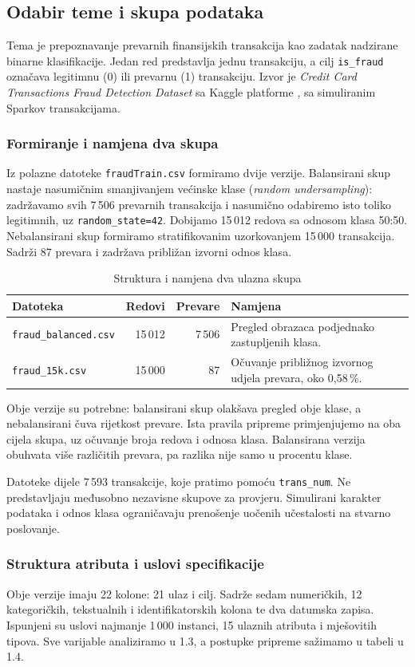 \subsection{Odabir teme i skupa podataka}\label{sec:podaci}
Tema je prepoznavanje prevarnih finansijskih transakcija kao zadatak nadzirane
binarne klasifikacije. Jedan red predstavlja jednu transakciju, a cilj
\texttt{is\_fraud} označava legitimnu (0) ili prevarnu (1) transakciju.
Izvor je \emph{Credit Card Transactions Fraud Detection Dataset} sa Kaggle platforme
\cite{kaggle_fraud}, sa simuliranim Sparkov transakcijama.

\subsubsection*{Formiranje i namjena dva skupa}
Iz polazne datoteke \texttt{fraudTrain.csv} formiramo dvije verzije.
Balansirani skup nastaje nasumičnim smanjivanjem većinske klase
(\emph{random undersampling}): zadržavamo svih 7\,506 prevarnih transakcija i
nasumično odabiremo isto toliko legitimnih, uz \texttt{random\_state=42}.
Dobijamo 15\,012 redova sa odnosom klasa 50:50.
Nebalansirani skup formiramo stratifikovanim uzorkovanjem 15\,000 transakcija.
Sadrži 87 prevara i zadržava približan izvorni odnos klasa.

\begin{table}[H]\centering\small
\caption{Struktura i namjena dva ulazna skupa}\label{tab:osnovni}
\begin{tabularx}{\linewidth}{@{}YrrY@{}}\toprule
Datoteka & Redovi & Prevare & Namjena \\ \midrule
\texttt{fraud\_balanced.csv} & 15\,012 & 7\,506 & Pregled obrazaca podjednako zastupljenih klasa. \\
\texttt{fraud\_15k.csv} & 15\,000 & 87 & Očuvanje približnog izvornog udjela prevara, oko 0,58\,\%. \\
\bottomrule\end{tabularx}\end{table}

Obje verzije su potrebne: balansirani skup olakšava pregled obje klase,
a nebalansirani čuva rijetkost prevare. Ista pravila pripreme primjenjujemo
na oba cijela skupa, uz očuvanje broja redova i odnosa klasa. Balansirana
verzija obuhvata više različitih prevara, pa razlika nije samo u procentu klase.

Datoteke dijele 7\,593 transakcije, koje pratimo pomoću \texttt{trans\_num}.
Ne predstavljaju međusobno nezavisne skupove za provjeru. Simulirani karakter
podataka i odnos klasa ograničavaju prenošenje uočenih učestalosti na stvarno poslovanje.

\subsubsection*{Struktura atributa i uslovi specifikacije}
Obje verzije imaju 22 kolone: 21 ulaz i cilj. Sadrže sedam numeričkih,
12 kategoričkih, tekstualnih i identifikatorskih kolona te dva datumska zapisa.
Ispunjeni su uslovi najmanje 1\,000 instanci, 15 ulaznih atributa i mješovitih tipova.
Sve varijable analiziramo u 1.3, a postupke pripreme sažimamo u tabeli u 1.4.
